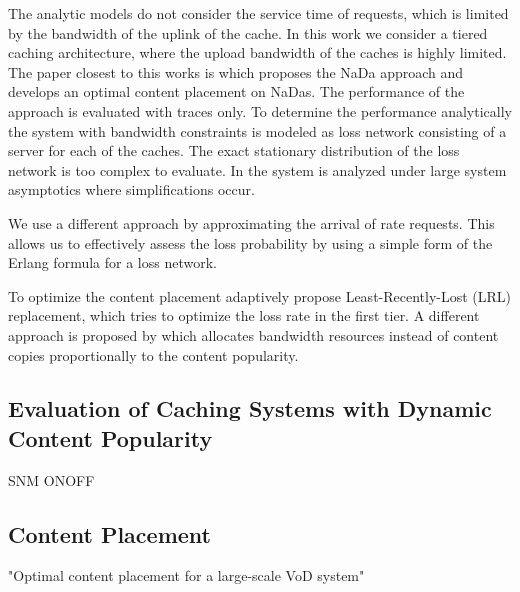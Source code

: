 The analytic models do not consider the service time of requests, which is limited by the bandwidth of the uplink of the cache.
In this work we consider a tiered caching architecture, where the upload bandwidth of the caches is highly limited.
The paper closest to this works is \cite{valancius2009greening} which proposes the NaDa approach and develops an optimal content placement on NaDas.
The performance of the approach is evaluated with traces only.
To determine the performance analytically the system with bandwidth constraints is modeled as loss network consisting of a server for each of the caches. The exact stationary distribution of the loss network is too complex to evaluate.
In \cite{tan2013optimal} the system is analyzed under large system asymptotics where simplifications occur.

We use a different approach by approximating the arrival of rate requests.
This allows us to effectively assess the loss probability by using a simple form of the Erlang formula for a loss network.

To optimize the content placement adaptively \cite{leconte2014adaptive} propose Least-Recently-Lost (LRL) replacement, which tries to optimize the loss rate in the first tier.
A different approach is proposed by \cite{zhou2015unifying} which allocates bandwidth resources instead of content copies proportionally to the content popularity.

\subsection{Evaluation of Caching Systems with Dynamic Content Popularity}

SNM
ONOFF

\subsection{Content Placement}

"Optimal content placement for a large-scale VoD system"
